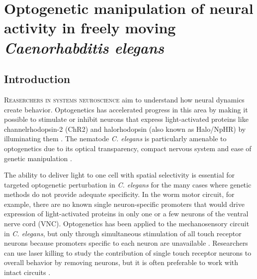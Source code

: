 


\chapter{Optogenetic manipulation of neural activity in freely moving \textit{Caenorhabditis elegans}}\label{chapter:colbert}



\section{Introduction}
\lettrine{R}{easerchers in systems neuroscience} aim to understand how neural dynamics create behavior. Optogenetics has accelerated progress in this area by making it possible to stimulate or inhibit neurons that express light-activated proteins like channelrhodopsin-2 (ChR2) and halorhodopsin (also known as Halo/NpHR) by illuminating them \citep{nagel_channelrhodopsin-2_2003, boyden_millisecond-timescale_2005, zhang_channelrhodopsin-2_2006, han_multiple-color_2007,szobota_remote_2007,zhang_multimodal_2007,chow_high-performance_2010}. 
The nematode \textit{C. elegans} is particularly amenable to optogenetics due to its optical transparency, compact nervous system and ease of genetic manipulation \citep{nagel_light_2005, liewald_optogenetic_2008, guo_optical_2009,stirman_high-throughput_2010}.

The ability to deliver light to one cell with spatial selectivity is essential for targeted optogenetic perturbation in \textit{C. elegans} for the many cases where genetic methods do not provide adequate specificity. In the worm motor circuit, for example, there are no known single neuron-specific promoters that would drive expression of light-activated proteins in only one or a few neurons of the ventral nerve cord (VNC).
Optogenetics has been applied to the mechanosensory circuit in \textit{C. elegans}, but only through simultaneous stimulation of all touch receptor neurons because promoters specific to each neuron are unavailable \citep{nagel_channelrhodopsin-2_2003}. 
Researchers can use laser killing to study the contribution of single touch receptor neurons to overall behavior by removing neurons, but it is often preferable to work with intact circuits \citep{chalfie_neural_1985, wicks_dynamic_1996, kitamura_contribution_2001}.


